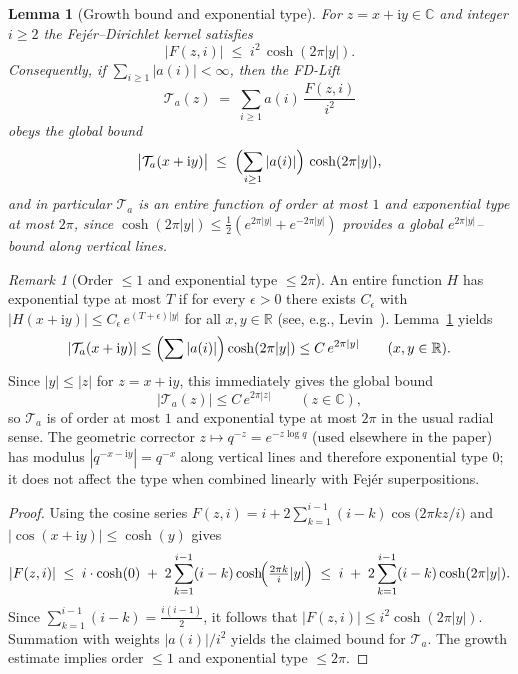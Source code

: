 \documentclass[11pt,a4paper]{amsart}
\newcommand{\C}{\mathbb{C}}
\newcommand{\ii}{\mathrm{i}}
\theoremstyle{plain}
\newtheorem{lemma}[theorem]{Lemma}
\theoremstyle{definition}
\theoremstyle{remark}
\newtheorem{remark}[theorem]{Remark}
\begin{document}
\begin{lemma}[Growth bound and exponential type]\label{lem:growth-type}
For $z=x+\mathrm{i}y\in\C$ and integer $i\ge2$ the Fej\'er–Dirichlet kernel satisfies
\[
\bigl|F(z,i)\bigr|\;\le\; i^2\,\cosh(2\pi|y|).
\]
Consequently, if $\sum_{i\ge1}|a(i)|<\infty$, then the FD-Lift
\[
\mathcal{T}_a(z)\;=\;\sum_{i\ge1} a(i)\,\frac{F(z,i)}{i^2}
\]
obeys the global bound
\[
\bigl|\mathcal{T}_a(x+\mathrm{i}y)\bigr|\;\le\;\Bigl(\sum_{i\ge1}|a(i)|\Bigr)\,\cosh(2\pi|y|),
\]
and in particular $\mathcal{T}_a$ is an entire function of order at most $1$ and exponential type at most $2\pi$, since $\cosh(2\pi|y|)\le \tfrac12(e^{2\pi|y|}+e^{-2\pi|y|})$ provides a global $e^{2\pi|y|}$–bound along vertical lines.
\end{lemma}

\begin{remark}[Order $\le 1$ and exponential type $\le 2\pi$]
An entire function $H$ has exponential type at most $T$ if for every $\epsilon>0$ there exists $C_\epsilon$ with $|H(x+\ii y)|\le C_\epsilon\,e^{(T+\epsilon)|y|}$ for all $x,y\in\mathbb R$ (see, e.g., Levin~\cite{levin1996}). Lemma~\ref{lem:growth-type} yields 
\[
|\mathcal T_a(x+\ii y)|\le \Bigl(\sum |a(i)|\Bigr)\cosh(2\pi|y|)\le C\,e^{2\pi|y|}
\qquad(x,y\in\mathbb R).
\]
Since $|y|\le |z|$ for $z=x+\ii y$, this immediately gives the global bound
\[
|\mathcal T_a(z)|\le C\,e^{2\pi|z|}\qquad(z\in\mathbb C),
\]
so $\mathcal T_a$ is of order at most $1$ and exponential type at most $2\pi$ in the usual radial sense. The geometric corrector $z\mapsto q^{-z}=e^{-z\log q}$ (used elsewhere in the paper) has modulus $|q^{-x-\ii y}|=q^{-x}$ along vertical lines and therefore exponential type $0$; it does not affect the type when combined linearly with Fej\'er superpositions.
\end{remark}

\begin{proof}
Using the cosine series $F(z,i)= i+2\sum_{k=1}^{i-1}(i-k)\cos\!\bigl(2\pi k z/i\bigr)$ and $|\cos(x+\mathrm{i}y)|\le\cosh(y)$ gives
\[
|F(z,i)|\;\le\; i\cdot\cosh(0)\;+\;2\sum_{k=1}^{i-1}(i-k)\cosh\!\Bigl(\tfrac{2\pi k}{i}|y|\Bigr)
\;\le\; i\;+\;2\sum_{k=1}^{i-1}(i-k)\cosh(2\pi|y|).
\]
Since $\sum_{k=1}^{i-1}(i-k)=\tfrac{i(i-1)}{2}$, it follows that $|F(z,i)|\le i^2\cosh(2\pi|y|)$. Summation with weights $|a(i)|/i^2$ yields the claimed bound for $\mathcal{T}_a$. The growth estimate implies order $\le 1$ and exponential type $\le 2\pi$.
\end{proof}
\end{document}
